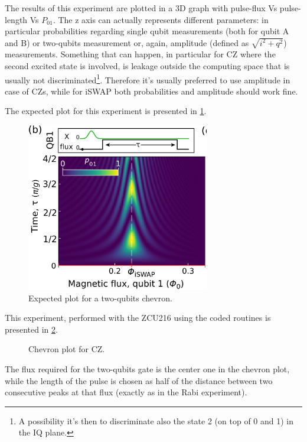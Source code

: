 The results of this experiment are plotted in a 3D graph with pulse-flux Vs pulse-length Vs $P_{01}$.
The z axis can actually represents different parameters: in particular probabilities regarding single qubit measurements (both for qubit A and B) or two-qubits measurement or, again, amplitude (defined as $\sqrt{i^2 + q^2}$) measurements.
Something that can happen, in particular for CZ where the second excited state is involved, is leakage outside the computing space that is usually not discriminated\footnote{A possibility it's then to discriminate also the state 2 (on top of 0 and 1) in the IQ plane.}.
Therefore it's usually preferred to use amplitude in case of CZs, while for iSWAP both probabilities and amplitude should work fine.

The expected plot for this experiment is presented in \cref{fig:chevron_sketch}.

\begin{figure}[htbp]
    \centering
    \includegraphics[width=8cm]{Two-qubits calibration/Figures/chevron_sketch.png}
    \caption{Expected plot for a two-qubits chevron.}
    \label{fig:chevron_sketch}
\end{figure}

This experiment, performed with the ZCU216 using the coded \Qibocal routines is presented in \cref{fig:nice_chevron}.

\begin{figure}[htbp]
    \centering
    \caption{Chevron plot for CZ.}
    \label{fig:nice_chevron}
\end{figure}

The flux required for the two-qubits gate is the center one in the chevron plot, while the length of the pulse is chosen as half of the distance between two consecutive peaks at that flux (exactly as in the Rabi experiment).

